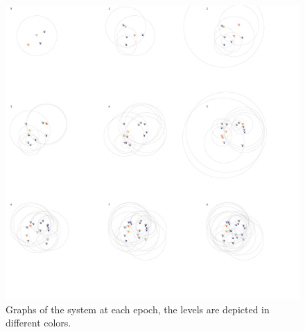 \documentclass[a4paper,11pt,oneside]{report}
\begin{document}
\begin{figure}[!h] 
\centering
\includegraphics[width=500pt]{figures/LocarnoTreaties-LocarnoFinal}
\caption{Graphs of the system at each epoch, the levels are depicted in different colors.}
\label{fig:LocarnoTreaties-LocarnoFinal}
\end{figure}
\end{document}

